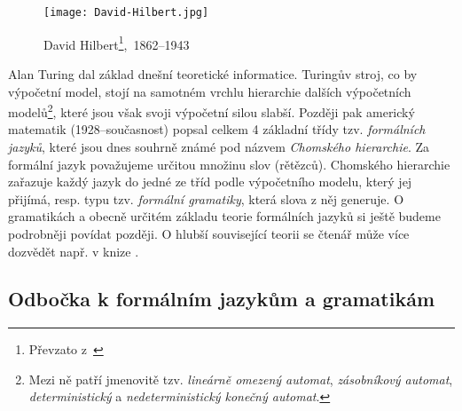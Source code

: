 \begin{figure}[h]
    \centering
    \texttt{[image: David-Hilbert.jpg]}
    \caption[David Hilbert,~1862--1943]{David Hilbert\footnote{Převzato z~\cite{OConnorHilbert2025}},~1862--1943}
    \label{fig:david-hilbert}
\end{figure}
Alan Turing dal základ dnešní teoretické informatice. Turingův stroj, co by výpočetní model, stojí na samotném vrchlu hierarchie dalších výpočetních modelů\footnote{Mezi ně patří jmenovitě tzv. \textit{lineárně omezený automat}, \emph{zásobníkový automat}, \emph{deterministický} a \emph{nedeterministický konečný automat}.}, které jsou však svoji výpočetní silou slabší.  Později pak americký matematik  (1928--současnost) popsal celkem 4 základní třídy tzv. \emph{formálních jazyků}, které jsou dnes souhrně známé pod názvem \emph{Chomského hierarchie}. Za formální jazyk považujeme určitou množinu slov (rětězců). Chomského hierarchie zařazuje každý jazyk do jedné ze tříd podle výpočetního modelu, který jej přijímá, resp. typu tzv. \emph{formální gramatiky}, která slova z něj generuje. O gramatikách a obecně určitém základu teorie formálních jazyků si ještě budeme podrobněji povídat později. O hlubší související teorii se čtenář může více dozvědět např. v knize \cite{Motwani2003}.

\subsection{Odbočka k formálním jazykům a gramatikám}\label{subsec:formalni-jazyky-a-gramatiky}

